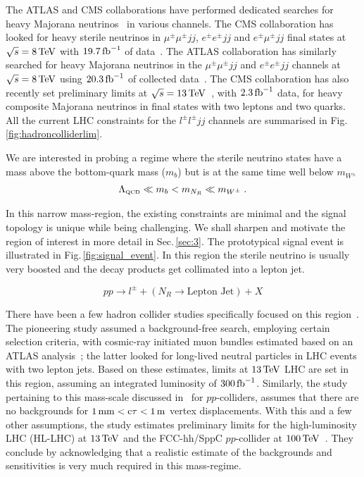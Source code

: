 \documentclass[reprint,doublecolumn,secnumarabic,amssymb, amsmath, aps,nofootinbib,superscriptaddress]{revtex4-1}
\newcommand{\be}{\begin{equation}}
\newcommand{\ee}{\end{equation}}
\newcommand{\ba}{\begin{eqnarray*}}
\newcommand{\ea}{\end{eqnarray*}}
\newcommand{\Sec}[1]{Sec.\,\ref{#1}}
\newcommand{\Fig}[1]{Fig.\,\ref{#1}}
\begin{document}
The ATLAS and CMS collaborations have performed dedicated searches for heavy Majorana neutrinos~\cite{Khachatryan:2015gha, Aad:2015xaa, Khachatryan:2016olu,Sirunyan:2017xnz} in various channels. The CMS collaboration has looked for heavy sterile neutrinos in $\mu^\pm \mu^\pm jj$, $e^\pm e^\pm jj$ and $e^\pm\mu^\pm jj$ final states at $\sqrt{s}=8\,\rm{TeV}$ with  $19.7\,\rm{fb}^{-1}$ of data~\cite{Khachatryan:2015gha,Khachatryan:2016olu}. The ATLAS collaboration has similarly searched for heavy Majorana neutrinos in the $\mu^\pm \mu^\pm jj$ and $e^\pm e^\pm jj$ channels at $\sqrt{s}=8\,\rm{TeV}$ using $20.3\,\rm{fb}^{-1}$ of collected data~\cite{Aad:2015xaa}. The CMS collaboration has also recently set preliminary limits at $\sqrt{s}=13\,\rm{TeV}$~\cite{Sirunyan:2017xnz}, with $2.3\,\rm{fb}^{-1}$ data, for heavy composite Majorana neutrinos in final states with two leptons and two quarks. All the current LHC constraints for the $l^\pm l^\pm jj$ channels are summarised in \Fig{fig:hadroncolliderlim}.

We are interested in probing a regime where the sterile neutrino states have a mass above the bottom-quark mass ($m_b$) but is at the same time well below $m_{W^\pm}$ 
\ba
\Lambda_{\text{\tiny{QCD}}} \ll m_b < m_{N_R} \ll m_{W^\pm} \; .
\ea

In this narrow mass-region, the existing constraints are minimal and the signal topology is unique while being challenging. We shall sharpen and motivate the region of interest in more detail in \Sec{sec:3}. The prototypical signal event is illustrated in \Fig{fig:signal_event}. In this region the sterile neutrino is usually very boosted and the decay products get collimated into a lepton jet.

\be
pp \rightarrow l^\pm + (N_R \rightarrow \text{Lepton Jet})+X
\ee

There have been a few hadron collider studies specifically focused on this region~\cite{Izaguirre:2015pga, Antusch:2016ejd}. The pioneering study \cite{Izaguirre:2015pga} assumed a background-free search, employing certain selection criteria, with cosmic-ray initiated muon bundles estimated based on an ATLAS analysis~\cite{Aad:2014yea}; the latter looked for long-lived neutral particles in LHC events with two lepton jets. Based on these estimates, limits at $13\,\rm{TeV}$ LHC are set in this region, assuming an integrated luminosity of $300\,\rm{fb}^{-1}$. Similarly, the study pertaining to this mass-scale discussed in~\cite{Antusch:2016ejd} for $pp$-colliders, assumes that there are no backgrounds for $1\,\rm{mm}<c\tau<1\,\rm{m}$ vertex displacements. With this and a few other assumptions, the study estimates preliminary limits for the high-luminosity LHC (HL-LHC) at $13\,\rm{TeV}$ and the FCC-hh/SppC $pp$-collider at $100\,\rm{TeV}$~\cite{Golling:2016gvc,CEPC-SPPCStudyGroup:2015csa}. They conclude by acknowledging that a realistic estimate of the backgrounds and sensitivities is very much required in this mass-regime.
\end{document}
